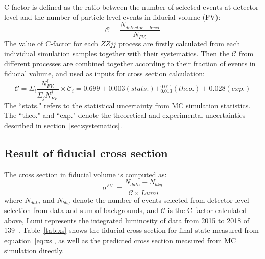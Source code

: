 C-factor is defined as the ratio between the number of selected events at detector-level and the number of particle-level events in fiducial volume (FV):
\begin{equation}
	\mathcal{C} = \frac{N_{detector-level}}{N_{FV.}}
\end{equation}
The value of C-factor for each $ZZjj$ process are firstly calculated from each individual simulation samples together with their systematics.
Then the $\mathcal{C}$ from different processes are combined together according to their fraction of events in fiducial volume,
and used as inputs for cross section calculation:
\begin{equation}
	\mathcal{C} = \Sigma_{i} \frac{N_{FV.}^{i}}{\Sigma_{j} N_{FV.}^{j}} \times \mathcal{C}_{i} = 0.699\pm0.003(stats.)\pm^{0.011}_{0.013}(theo.)\pm0.028(exp.)
\end{equation}
The ``stats." refers to the statistical uncertainty from MC simulation statistics.
The ``theo." and ``exp." denote the theoretical and experimental uncertainties described in section~\ref{sec:systematics}.

\subsection{Result of fiducial cross section}

The cross section in fiducial volume is computed as:
\begin{equation}\label{eq:xs}
	\sigma^{FV.} = \frac{N_{data} - N_{bkg}}{\mathcal{C} \times Lumi}
\end{equation}
where $N_{data}$ and $N_{bkg}$ denote the number of events selected from detector-level selection from data and sum of backgrounds,
and $\mathcal{C}$ is the C-factor calculated above, Lumi represents the integrated luminosity of data from 2015 to 2018 of 139~\ifb.
Table~\ref{tab:xs} shows the fiducial cross section for \llll final state measured from equation~\ref{eq:xs}, 
as well as the predicted cross section measured from MC simulation directly.

